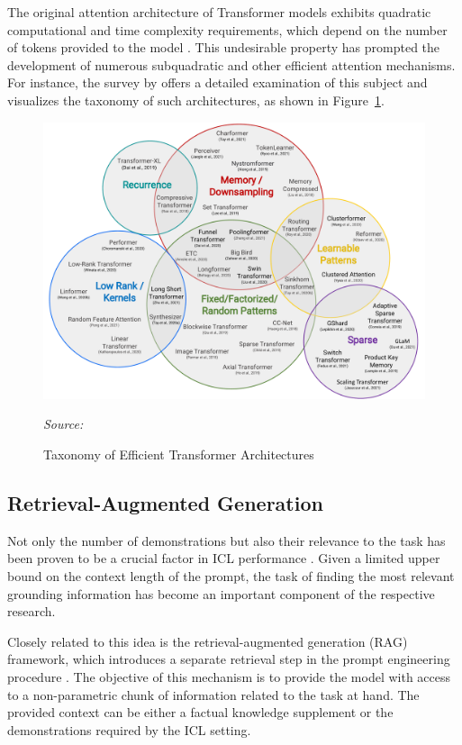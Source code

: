 The original attention architecture of Transformer models exhibits quadratic computational and time complexity requirements, which depend on the number of tokens provided to the model \parencite{vaswani2017}. This undesirable property has prompted the development of numerous subquadratic and other efficient attention mechanisms. For instance, the survey by \citet{tay2022} offers a detailed examination of this subject and visualizes the taxonomy of such architectures, as shown in Figure~\ref{fig:taxonomy-of-transformers}.

\begin{figure}[ht]
    \centering
    \includegraphics[width=\textwidth]{figures/taxonomy-of-transformers.pdf}
    \caption{Taxonomy of Efficient Transformer Architectures}\label{fig:taxonomy-of-transformers}
    \hfill\textit{Source: \citet{tay2022}}
\end{figure}

\subsection{Retrieval-Augmented Generation}

Not only the number of demonstrations but also their relevance to the task has been proven to be a crucial factor in ICL performance \parencite{liu2021}. Given a limited upper bound on the context length of the prompt, the task of finding the most relevant grounding information has become an important component of the respective research.

Closely related to this idea is the retrieval-augmented generation (RAG) framework, which introduces a separate retrieval step in the prompt engineering procedure \parencite{lewis2020}. The objective of this mechanism is to provide the model with access to a non-parametric chunk of information related to the task at hand. The provided context can be either a factual knowledge supplement or the demonstrations required by the ICL setting.

